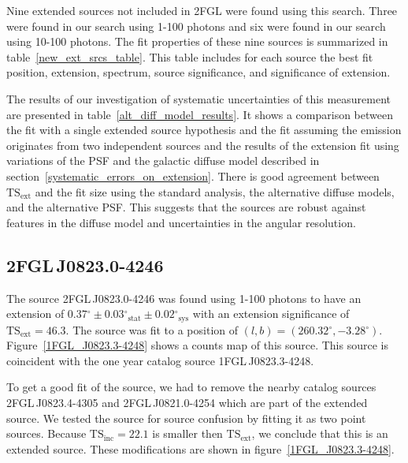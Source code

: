 \documentclass[12pt,preprint]{aastex}
\newcommand{\gev}{\text{GeV}\xspace}
\newcommand{\tsext}{{\ensuremath{\text{TS}_{\text{ext}}}}\xspace}
\newcommand{\tsinc}{\ensuremath{\text{TS}_{\text{inc}}}\xspace}
\newcommand{\sys}{\text{sys}\xspace}
\newcommand{\stat}{\text{stat}\xspace}
\renewcommand{\deg}{\ensuremath{^\circ}\xspace}
\begin{document}

Nine extended sources not included in 2FGL were found using this search.
Three were found in our search using 1-100 \gev photons and six were
found in our search using 10-100 \gev photons.  The fit properties of
these nine sources is summarized in table~\ref{new_ext_srcs_table}.
This table includes for each source the best fit position, extension,
spectrum, source significance, and significance of extension.

The results of our investigation of systematic uncertainties of this
measurement are presented in 
table~\ref{alt_diff_model_results}.  It
shows a comparison between the fit with a single extended source
hypothesis and the fit assuming the emission originates from two
independent sources and  the
results of the extension fit using variations of the PSF and the galactic
diffuse model described in section~\ref{systematic_errors_on_extension}.
There is good agreement between \tsext and the fit size using
the standard analysis, the alternative diffuse models, and the alternative PSF.
This suggests that the sources are robust against features in the diffuse
model and uncertainties in the angular resolution.

\subsection{2FGL\,J0823.0-4246}
\label{section_2FGL_J0823.0-4246}


The source 2FGL\,J0823.0-4246 was found 
using 1-100 \gev photons to have an 
extension of $0.37\deg\pm0.03\deg_\stat\pm0.02\deg_\sys$ 
with an extension
significance of $\tsext=46.3$.  The source was fit to a position of
$(l,b)=(260.32\deg,-3.28\deg)$.  Figure~\ref{1FGL_J0823.3-4248} shows a
counts map of this source.  This source is coincident with the one year
catalog source 1FGL\,J0823.3-4248.

To get a good fit of the source, we had to remove the nearby catalog
sources 2FGL\,J0823.4-4305 and 2FGL\,J0821.0-4254 which are part of the
extended source.  We tested the source for source confusion by fitting
it as two point sources. Because $\tsinc=22.1$ is smaller then \tsext,
we conclude that this is an extended source.  These modifications are
shown in figure~\ref{1FGL_J0823.3-4248}.
\end{document}
